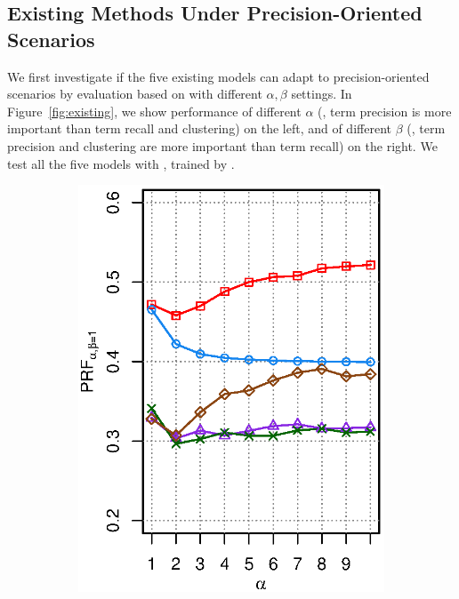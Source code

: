 \subsection{Existing Methods Under Precision-Oriented Scenarios}
\label{sec:precision-existing}
We first investigate if the five existing models can adapt to precision-oriented scenarios by evaluation based on \PRF with different $\alpha,\beta$ settings. In Figure~\ref{fig:existing}, we show \PRF performance of different $\alpha$ (\ie, term precision is more important than term recall and clustering) on the left, and of different $\beta$ (\ie, term precision and clustering are more important than term recall) on the right. We test all the five models with \QFI, \QFJ trained by \MLE. 
\begin{figure}[ht!]
\centering
\caption{$P\!R\!F_{\alpha,\beta}$ performance with different $\alpha$ (left, fixed $\beta\!=\!1$) and different $\beta$ (fixed $\alpha\!=\!1$, right) settings for existing methods on \DQF.}
\label{fig:existing}
\begin{subfigure}[b]{0.45\columnwidth}
\includegraphics[width=\columnwidth]{figure/qf13-prfa-5models.eps}

\end{subfigure}
\end{figure}
